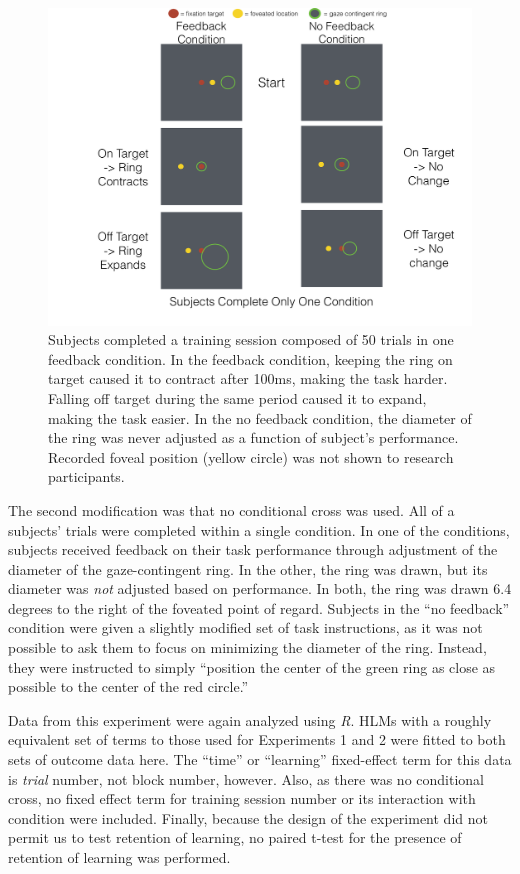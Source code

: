 \begin{figure}[!htbp]
\centering
\includegraphics[width=.75\linewidth,height=.75\textheight,keepaspectratio]{figures/chapter_3/feedback_demo.pdf}
\caption[Schematic Depiction of Experimental Design for Experiment 3]{Subjects completed a training session composed of 50 trials in one feedback condition. In the feedback condition, keeping the ring on target caused it to contract after 100ms, making the task harder. Falling off target during the same period caused it to expand, making the task easier. In the no feedback condition, the diameter of the ring was never adjusted as a function of subject's performance. Recorded foveal position (yellow circle) was not shown to research participants.}\label{chap_3_demo_figure}
\end{figure}

The second modification was that no conditional cross was used. All of a subjects' trials were completed within a single condition. In one of the conditions, subjects received feedback on their task performance through adjustment of the diameter of the gaze-contingent ring. In the other, the ring was drawn, but its diameter was \textit{not} adjusted based on performance. In both, the ring was drawn 6.4 degrees to the right of the foveated point of regard. Subjects in the ``no feedback'' condition were given a slightly modified set of task instructions, as it was not possible to ask them to focus on minimizing the diameter of the ring. Instead, they were instructed to simply ``position the center of the green ring as close as possible to the center of the red circle.''

Data from this experiment were again analyzed using \textit{R}. HLMs with a roughly equivalent set of terms to those used for Experiments 1 and 2 were fitted to both sets of outcome data here. The ``time'' or ``learning'' fixed-effect term for this data is \textit{trial} number, not block number, however. Also, as there was no conditional cross, no fixed effect term for training session number or its interaction with condition were included. Finally, because the design of the experiment did not permit us to test retention of learning, no paired t-test for the presence of retention of learning was performed. 

